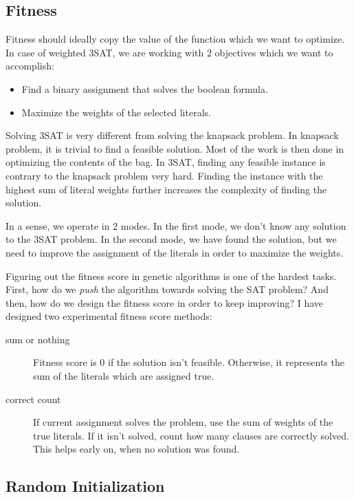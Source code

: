 \documentclass[a4paper,10pt]{article}
\begin{document}
\subsection{Fitness}

Fitness should ideally copy the value of the function which we want to optimize. In case of weighted 3SAT, we are working with 2 objectives which we want to accomplish:

\begin{itemize}
	\item Find a binary assignment that solves the boolean formula.
	\item Maximize the weights of the selected literals.
\end{itemize}

Solving 3SAT is very different from solving the knapsack problem. In knapsack problem, it is trivial to find a feasible solution. Most of the work is then done in optimizing the contents of the bag. In 3SAT, finding any feasible instance is contrary to the knapsack problem very hard. Finding the instance with the highest sum of literal weights further increases the complexity of finding the solution.

In a sense, we operate in 2 modes. In the first mode, we don't know any solution to the 3SAT problem. In the second mode, we have found the solution, but we need to improve the assignment of the literals in order to maximize the weights.

Figuring out the fitness score in genetic algorithms is one of the hardest tasks. First, how do we \emph{push} the algorithm towards solving the SAT problem? And then, how do we design the fitness score in order to keep improving? I have designed two experimental fitness score methods:

\begin{description}
	\item[sum or nothing] Fitness score is $0$ if the solution isn't feasible. Otherwise, it represents the sum of the literals which are assigned true.
	\item[correct count] If current assignment solves the problem, use the sum of weights of the true literals. If it isn't solved, count how many clauses are correctly solved. This helps early on, when no solution was found.
\end{description}

\subsection{Random Initialization}
\end{document}
